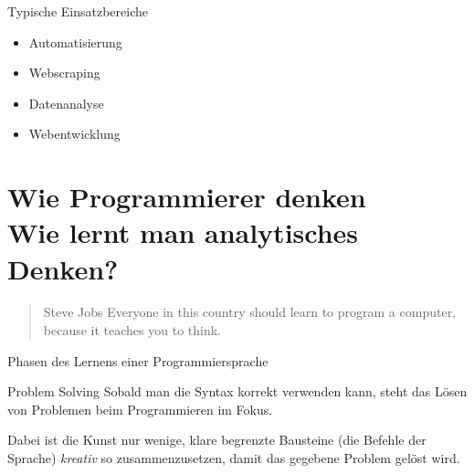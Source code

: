 \begin{frame}
	\begin{block}{Typische Einsatzbereiche}
		\begin{itemize}
			\item Automatisierung
			\item Webscraping
			\item Datenanalyse
			\item Webentwicklung
		\end{itemize}
	\end{block}
\end{frame}





\section{Wie Programmierer denken \\ \footnotesize{Wie lernt man analytisches Denken?}}

\begin{frame}
\begin{quote}{Steve Jobs}
	Everyone in this country should learn to program a computer, because it teaches you to think.
\end{quote}
\end{frame}



\begin{frame}
\begin{block}{Phasen des Lernens einer Programmiersprache}
\vspace{2pt}
\end{block}
\end{frame}

\begin{frame}

\begin{block}{Problem Solving}
\vspace{2pt}
Sobald man die Syntax korrekt verwenden kann, steht das Lösen von Problemen beim Programmieren im Fokus.

\pause 

Dabei ist die Kunst nur wenige, klare begrenzte Bausteine (die Befehle der Sprache) \emph{kreativ} so zusammenzusetzen, damit das gegebene Problem gelöst wird. 
\end{block}
\end{frame}

